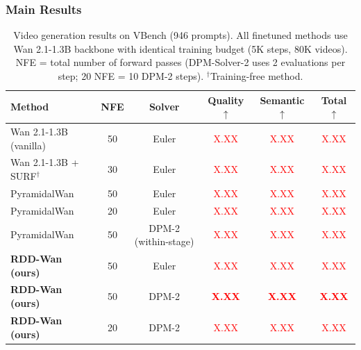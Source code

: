 \documentclass[10pt]{article}
\begin{document}
\subsubsection{Main Results}

\begin{table}[t]
\centering
\caption{Video generation results on VBench (946 prompts). All finetuned methods use Wan 2.1-1.3B backbone with identical training budget (5K steps, 80K videos). NFE = total number of forward passes (DPM-Solver-2 uses 2 evaluations per step; 20 NFE = 10 DPM-2 steps). $^\dagger$Training-free method.}
\label{tab:video_main}
\small
\begin{tabular}{@{}lccccc@{}}
\toprule
\textbf{Method} & \textbf{NFE} & \textbf{Solver} & \textbf{Quality} $\uparrow$ & \textbf{Semantic} $\uparrow$ & \textbf{Total} $\uparrow$ \\
\midrule
Wan 2.1-1.3B (vanilla) & 50 & Euler & \textcolor{red}{X.XX} & \textcolor{red}{X.XX} & \textcolor{red}{X.XX} \\
Wan 2.1-1.3B + SURF$^\dagger$ & 30 & Euler & \textcolor{red}{X.XX} & \textcolor{red}{X.XX} & \textcolor{red}{X.XX} \\
\midrule
PyramidalWan & 50 & Euler & \textcolor{red}{X.XX} & \textcolor{red}{X.XX} & \textcolor{red}{X.XX} \\
PyramidalWan & 20 & Euler & \textcolor{red}{X.XX} & \textcolor{red}{X.XX} & \textcolor{red}{X.XX} \\
PyramidalWan & 50 & DPM-2 (within-stage) & \textcolor{red}{X.XX} & \textcolor{red}{X.XX} & \textcolor{red}{X.XX} \\
\midrule
\textbf{RDD-Wan (ours)} & 50 & Euler & \textcolor{red}{X.XX} & \textcolor{red}{X.XX} & \textcolor{red}{X.XX} \\
\textbf{RDD-Wan (ours)} & 50 & DPM-2 & \textcolor{red}{\textbf{X.XX}} & \textcolor{red}{\textbf{X.XX}} & \textcolor{red}{\textbf{X.XX}} \\
\textbf{RDD-Wan (ours)} & 20 & DPM-2 & \textcolor{red}{X.XX} & \textcolor{red}{X.XX} & \textcolor{red}{X.XX} \\
\bottomrule
\end{tabular}
\end{table}
\end{document}
